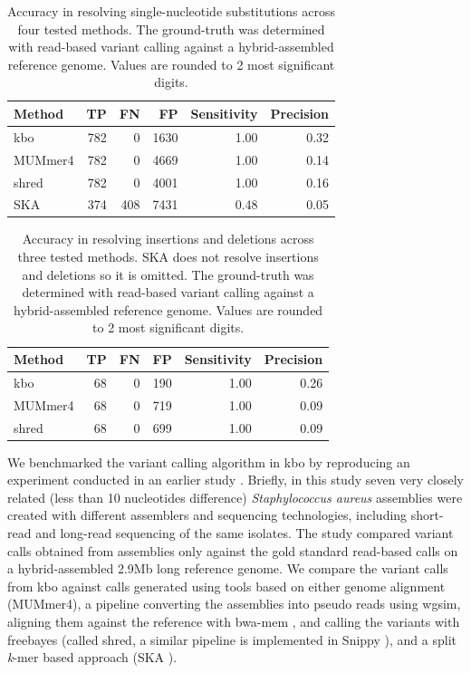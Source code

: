 \documentclass[unnumsec,webpdf,contemporary,large]{oup-authoring-template}%
\theoremstyle{thmstyleone}%
\theoremstyle{thmstyletwo}%
\theoremstyle{thmstylethree}%
\begin{document}
\begin{table}[]
\begin{tabular}{lrrrrr}
Method & TP  & FN  & FP   & Sensitivity & Precision \\
\hline
kbo    & 782 & 0   & 1630 & 1.00    & 0.32  \\
MUMmer4 & 782 & 0   & 4669 & 1.00    & 0.14  \\
shred  & 782 & 0   & 4001 & 1.00    & 0.16  \\
SKA    & 374 & 408 & 7431 & 0.48    & 0.05
\end{tabular}
\caption{Accuracy in resolving single-nucleotide substitutions across four tested methods. The ground-truth was determined with read-based variant calling against a hybrid-assembled reference genome. Values are rounded to 2 most significant digits.}
\label{vc-snps}
\end{table}
\begin{table}[]
\begin{tabular}{lrrrrr}
Method & TP & FN & FP  & Sensitivity & Precision \\
\hline
kbo    & 68 & 0  & 190 & 1.00    & 0.26  \\
MUMmer4 & 68 & 0  & 719 & 1.00    & 0.09  \\
shred  & 68 & 0  & 699 & 1.00    & 0.09  
\end{tabular}
\caption{Accuracy in resolving insertions and deletions across three tested methods. SKA does not resolve insertions and deletions so it is omitted. The ground-truth was determined with read-based variant calling against a hybrid-assembled reference genome. Values are rounded to 2 most significant digits.}
\label{vc-indels}
\end{table}

We benchmarked the variant calling algorithm in {\sf kbo} by reproducing an experiment conducted in an earlier study \cite{wick2025reads}. Briefly, in this study seven very closely related (less than 10 nucleotides difference) \textit{Staphylococcus aureus} assemblies were created with different assemblers and sequencing technologies, including short-read and long-read sequencing of the same isolates. The study compared variant calls obtained from assemblies only against the gold standard read-based calls on a hybrid-assembled 2.9Mb long reference genome. We compare the variant calls from {\sf kbo} against calls generated using tools based on either genome alignment (MUMmer4\cite{marccais2018mummer4}), a pipeline converting the assemblies into pseudo reads using wgsim, aligning them against the reference with bwa-mem \cite{li2013aligning}, and calling the variants with freebayes \cite{garrison2012haplotype} (called shred, a similar pipeline is implemented in Snippy \cite{seemann2015snippy}), and a split \emph{k}-mer based approach (SKA \cite{derelle2024seamless}).
\end{document}
